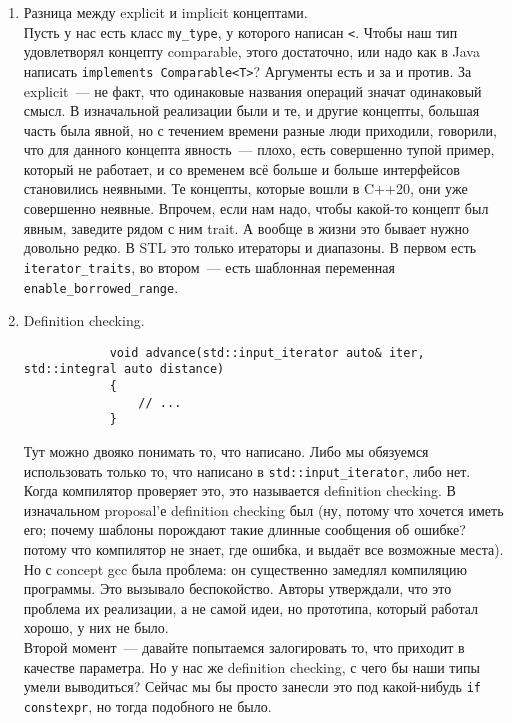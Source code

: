 \documentclass{article}
\begin{document}
    \begin{enumerate}
        \item Разница между explicit и implicit концептами.\\
        Пусть у нас есть класс \texttt{my_type}, у которого написан \texttt{<}. Чтобы наш тип удовлетворял концепту comparable, этого достаточно, или надо как в Java написать \texttt{implements Comparable<T>}? Аргументы есть и за и против. За explicit~--- не факт, что одинаковые названия операций значат одинаковый смысл. В изначальной реализации были и те, и другие концепты, большая часть была явной, но с течением времени разные люди приходили, говорили, что для данного концепта явность~--- плохо, есть совершенно тупой пример, который не работает, и со временем всё больше и больше интерфейсов становились неявными. Те концепты, которые вошли в C++20, они уже совершенно неявные. Впрочем, если нам надо, чтобы какой-то концепт был явным, заведите рядом с ним trait. А вообще в жизни это бывает нужно довольно редко. В STL это только итераторы и диапазоны. В первом есть \texttt{iterator_traits}, во втором~--- есть шаблонная переменная \texttt{enable_borrowed_range}.
        \item Definition checking.\\
        \begin{verbatim}
            void advance(std::input_iterator auto& iter, std::integral auto distance)
            {
                // ...
            }
        \end{verbatim}
        Тут можно двояко понимать то, что написано. Либо мы обязуемся использовать только то, что написано в \texttt{std::input_iterator}, либо нет. Когда компилятор проверяет это, это называется definition checking. В изначальном proposal'е definition checking был (ну, потому что хочется иметь его; почему шаблоны порождают такие длинные сообщения об ошибке? потому что компилятор не знает, где ошибка, и выдаёт все возможные места). Но с concept gcc была проблема: он существенно замедлял компиляцию программы. Это вызывало беспокойство. Авторы утверждали, что это проблема их реализации, а не самой идеи, но прототипа, который работал хорошо, у них не было.\\
        Второй момент~--- давайте попытаемся залогировать то, что приходит в качестве параметра. Но у нас же definition checking, с чего бы наши типы умели выводиться? Сейчас мы бы просто занесли это под какой-нибудь \texttt{if constexpr}, но тогда подобного не было.\\

\end{enumerate}
\end{document}
